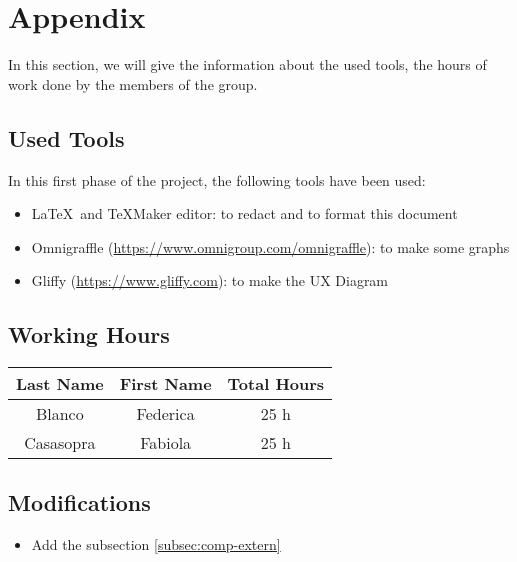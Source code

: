 \section{Appendix} \label{sec:appendix}

In this section, we will give the information about the used tools, the hours of work done by the members of the group.

\subsection{Used Tools} \label{tools}

In this first phase of the project, the following tools have been used:

\begin{itemize}
	\item \LaTeX\ and TeXMaker editor: to redact and to format this document
	\item Omnigraffle (\url{https://www.omnigroup.com/omnigraffle}): to make some graphs
	\item Gliffy (\url{https://www.gliffy.com}): to make the UX Diagram
\end{itemize}

\subsection{Working Hours} \label{worked}

\begin{table}[htbp]
\begin{center}
\begin{tabular}[t]{ccc}

\hline
\textbf{Last Name} & \textbf{First Name} & \textbf{Total Hours} \\
\hline
Blanco & Federica &  25 h\\
\hline
Casasopra & Fabiola &  25 h\\
\hline

\end{tabular}
\end{center}
\end{table}

\subsection{Modifications} \label{modify}
\begin{itemize}
\item Add the subsection \ref{subsec:comp-extern}
\end{itemize}


